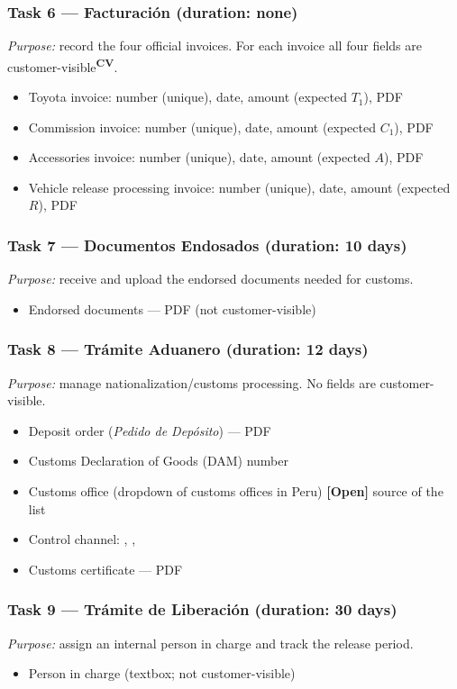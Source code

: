 \documentclass[11pt,a4paper]{article}
\newcommand{\code}[1]{\texttt{\detokenize{#1}}}
\newcommand{\tagopen}{\textcolor{red!70!black}{\textbf{[Open]}}}
\newcommand{\cv}{\textsuperscript{\textcolor{panablue}{\textbf{CV}}}}
\begin{document}
\subsubsection*{Task 6 --- Facturación (duration: none)}
\textit{Purpose:} record the four official invoices. For each invoice all four
fields are customer-visible\cv{}.
\begin{itemize}
	\item Toyota invoice: number (unique), date, amount (expected $T_1$), PDF
	\item Commission invoice: number (unique), date, amount (expected $C_1$), PDF
	\item Accessories invoice: number (unique), date, amount (expected $A$), PDF
	\item Vehicle release processing invoice: number (unique), date, amount
	      (expected $R$), PDF
\end{itemize}

\subsubsection*{Task 7 --- Documentos Endosados (duration: 10 days)}
\textit{Purpose:} receive and upload the endorsed documents needed for customs.
\begin{itemize}
	\item Endorsed documents --- PDF (not customer-visible)
\end{itemize}

\subsubsection*{Task 8 --- Trámite Aduanero (duration: 12 days)}
\textit{Purpose:} manage nationalization/customs processing. No fields are
customer-visible.
\begin{itemize}
	\item Deposit order (\emph{Pedido de Depósito}) --- PDF
	\item Customs Declaration of Goods (DAM) number
	\item Customs office (dropdown of customs offices in Peru) \tagopen{} source
	      of the list
	\item Control channel: \code{Verde}, \code{Naranja}, \code{Rojo}
	\item Customs certificate --- PDF
\end{itemize}

\subsubsection*{Task 9 --- Trámite de Liberación (duration: 30 days)}
\textit{Purpose:} assign an internal person in charge and track the release
period.
\begin{itemize}
	\item Person in charge (textbox; not customer-visible)
\end{itemize}
\end{document}

